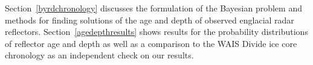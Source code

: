 




Section~\ref{byrdchronology} discusses the formulation of the Bayesian problem and methods for finding solutions of the age and depth of observed englacial radar reflectors. Section~\ref{agedepthresults} shows results for the probability distributions of reflector age and depth as well as a comparison to the WAIS Divide ice core chronology as an independent check on our results. %
